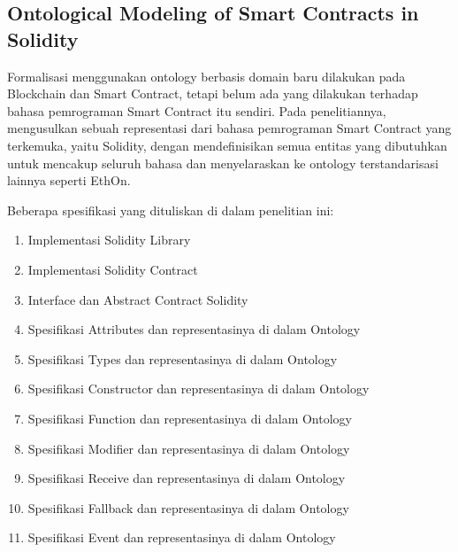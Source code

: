 \subsection{Ontological Modeling of Smart Contracts in Solidity}
\label{subsec:solidity-ontology}

Formalisasi menggunakan ontology berbasis domain baru dilakukan pada Blockchain dan Smart Contract, tetapi belum ada yang dilakukan terhadap bahasa pemrograman Smart Contract itu sendiri. Pada penelitiannya, \cite{cano2021toward} mengusulkan sebuah representasi dari bahasa pemrograman Smart Contract yang terkemuka, yaitu Solidity, dengan mendefinisikan semua entitas yang dibutuhkan untuk mencakup seluruh bahasa dan menyelaraskan ke ontology terstandarisasi lainnya seperti EthOn.

Beberapa spesifikasi yang dituliskan di dalam penelitian ini:

\begin{enumerate}
  \item Implementasi Solidity Library
  \item Implementasi Solidity Contract
  \item Interface dan Abstract Contract Solidity
  \item Spesifikasi Attributes dan representasinya di dalam Ontology 
  \item Spesifikasi Types dan representasinya di dalam Ontology
  \item Spesifikasi Constructor dan representasinya di dalam Ontology
  \item Spesifikasi Function dan representasinya di dalam Ontology
  \item Spesifikasi Modifier dan representasinya di dalam Ontology
  \item Spesifikasi Receive dan representasinya di dalam Ontology
  \item Spesifikasi Fallback dan representasinya di dalam Ontology
  \item Spesifikasi Event dan representasinya di dalam Ontology
\end{enumerate}